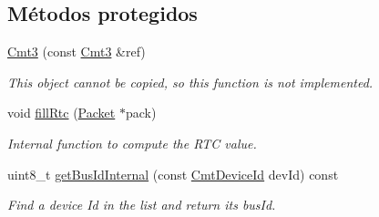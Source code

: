 \subsection*{\-Métodos protegidos}
\begin{DoxyCompactItemize}
\item 
\hypertarget{classxsens_1_1Cmt3_a43acfe805e725153f3aff10e7c0440e5}{\hyperlink{classxsens_1_1Cmt3_a43acfe805e725153f3aff10e7c0440e5}{\-Cmt3} (const \hyperlink{classxsens_1_1Cmt3}{\-Cmt3} \&ref)}\label{classxsens_1_1Cmt3_a43acfe805e725153f3aff10e7c0440e5}

\begin{DoxyCompactList}\small\item\em \-This object cannot be copied, so this function is not implemented. \end{DoxyCompactList}\item 
\hypertarget{classxsens_1_1Cmt3_a2fcd8f12017366634e2250377de1d443}{void \hyperlink{classxsens_1_1Cmt3_a2fcd8f12017366634e2250377de1d443}{fill\-Rtc} (\hyperlink{classxsens_1_1Packet}{\-Packet} $\ast$pack)}\label{classxsens_1_1Cmt3_a2fcd8f12017366634e2250377de1d443}

\begin{DoxyCompactList}\small\item\em \-Internal function to compute the \-R\-T\-C value. \end{DoxyCompactList}\item 
uint8\-\_\-t \hyperlink{classxsens_1_1Cmt3_a4b84390d9bd4730922961eb21c69002a}{get\-Bus\-Id\-Internal} (const \hyperlink{cmtdef_8h_a2e3b6a17360828d440ee848959918af2}{\-Cmt\-Device\-Id} dev\-Id) const 
\begin{DoxyCompactList}\small\item\em \-Find a device \-Id in the list and return its bus\-Id. \end{DoxyCompactList}\end{DoxyCompactItemize}
